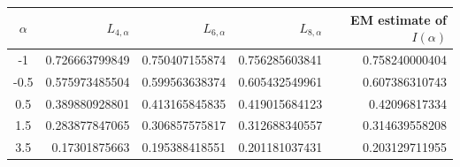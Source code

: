 \begin{tabular}{c rrr r}
\toprule
$\alpha$ & $L_{4,\alpha}$ & $L_{6,\alpha}$ & $L_{8,\alpha}$ & EM estimate of $I(\alpha)$ \\
\midrule
-1 & 0.726663799849 & 0.750407155874 & 0.756285603841 & 0.758240000404 \\
-0.5 & 0.575973485504 & 0.599563638374 & 0.605432549961 & 0.607386310743 \\
0.5 & 0.389880928801 & 0.413165845835 & 0.419015684123 & 0.42096817334 \\
1.5 & 0.283877847065 & 0.306857575817 & 0.312688340557 & 0.314639558208 \\
3.5 & 0.17301875663 & 0.195388418551 & 0.201181037431 & 0.203129711955 \\
\bottomrule
\end{tabular}
